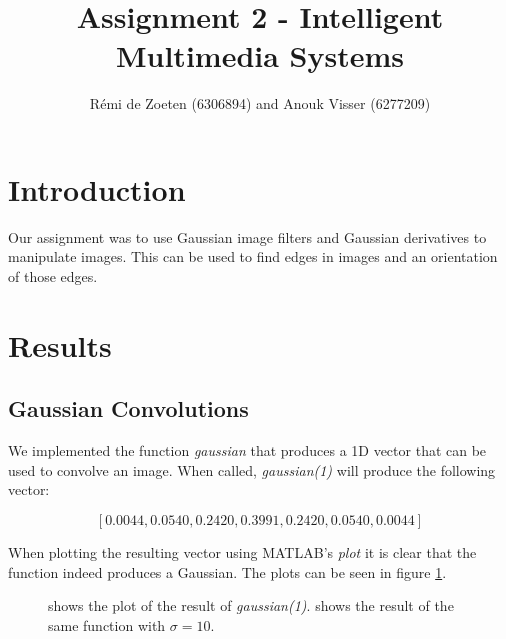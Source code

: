 \documentclass[a4paper]{article}
\title{Assignment 2 - Intelligent Multimedia Systems}
\author{R\'emi de Zoeten (6306894) and Anouk Visser (6277209)}
\begin{document}
\maketitle


\section{Introduction}
Our assignment was to use Gaussian image filters and Gaussian derivatives to manipulate images. This can be used to find edges in images and an orientation of those edges. 

\section{Results}
\subsection{Gaussian Convolutions}
We implemented the function \emph{gaussian} that produces a 1D vector that can be used to convolve an image. When called, \emph{gaussian(1)} will produce the following vector:

$$ [ 0.0044, 0.0540, 0.2420, 0.3991, 0.2420, 0.0540, 0.0044 ] $$

When plotting the resulting vector using MATLAB's \emph{plot} it is clear that the function indeed produces a Gaussian. The plots can be seen in figure \ref{gauss}.

\begin{figure}[H]
  \centering
  \caption{ shows the plot of the result of \emph{gaussian(1)}.  shows the result of the same function with $\sigma = 10$. }
  \label{gauss}
\end{figure}
\end{document}
